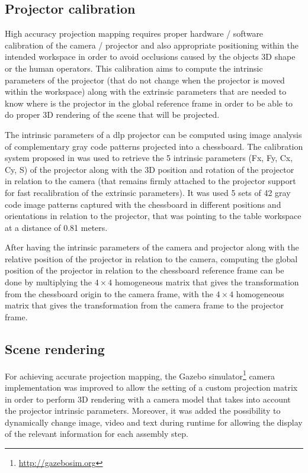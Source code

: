 \subsection{Projector calibration}

High accuracy projection mapping requires proper hardware / software calibration of the camera / projector and also appropriate positioning within the intended workspace in order to avoid occlusions caused by the objects 3D shape or the human operators. This calibration aims to compute the intrinsic parameters of the projector (that do not change when the projector is moved within the workspace) along with the extrinsic parameters that are needed to know where is the projector in the global reference frame in order to be able to do proper 3D rendering of the scene that will be projected.

The intrinsic parameters of a \gls{dlp} projector can be computed using image analysis of complementary gray code patterns projected into a chessboard. The calibration system proposed in \cite{Moreno2012} was used to retrieve the 5 intrinsic parameters (Fx, Fy, Cx, Cy, S) of the projector along with the 3D position and rotation of the projector in relation to the camera (that remains firmly attached to the projector support for fast recalibration of the extrinsic parameters). It was used 5 sets of 42 gray code image patterns captured with the chessboard in different positions and orientations in relation to the projector, that was pointing to the table workspace at a distance of 0.81 meters.

After having the intrinsic parameters of the camera and projector along with the relative position of the projector in relation to the camera, computing the global position of the projector in relation to the chessboard reference frame can be done by multiplying the $4 \times 4$ homogeneous matrix that gives the transformation from the chessboard origin to the camera frame, with the $4 \times 4$ homogeneous matrix that gives the transformation from the camera frame to the projector frame.



\subsection{Scene rendering}

For achieving accurate projection mapping, the Gazebo simulator\footnote{\url{http://gazebosim.org}} camera implementation was improved to allow the setting of a custom projection matrix in order to perform 3D rendering with a camera model that takes into account the projector intrinsic parameters. Moreover, it was added the possibility to dynamically change image, video and text during runtime for allowing the display of the relevant information for each assembly step.

